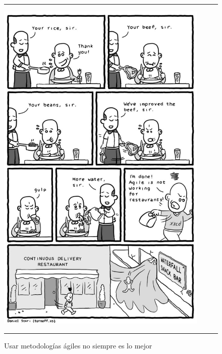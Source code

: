 \begin{figure}[h]
\hrule\smallskip
\begin{center}
\includegraphics[width=0.9\textwidth]{fig/comic.jpg}
\end{center}
\caption{Usar metodologías ágiles no siempre es lo mejor}
\label{fig:comic}
\hrule
\end{figure}
